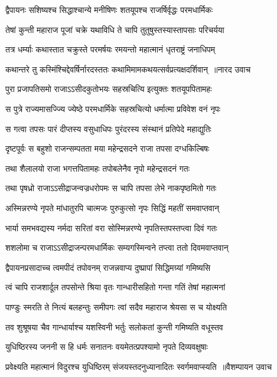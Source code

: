 \twolineshloka
{द्वैपायनः सशिष्यश्च सिद्धाश्चान्ये मनीषिणः}
{शतयूपश्च राजर्षिर्वृद्धः परमधार्मिकः}


\twolineshloka
{तेषां कुन्ती महाराज पूजां चक्रे यथाविधि}
{ते चापि तुतुषुस्तस्यास्तापसाः परिचर्यया}


\twolineshloka
{तत्र धर्म्याः कथास्तात चक्रुस्ते परमर्षयः}
{रमयन्तो महात्मानं धृतराष्ट्रं जनाधिपम्}


\threelineshloka
{कथान्तरे तु कस्मिंश्चिद्देवर्षिर्नारदस्ततः}
{कथामिमामकथयत्सर्वप्रत्यक्षदर्शिवान् ॥नारद उवाच}
{}


\twolineshloka
{पुरा प्रजापतिसमो राजाऽऽसीदकुतोभयः}
{सहस्रचित्यि इत्युक्तः शतयूपपितामहः}


\twolineshloka
{स पुत्रे राज्यमासज्ज्यि ज्येष्ठे परमधार्मिके}
{सहस्रचित्यो धर्मात्मा प्रविवेश वनं नृपः}


\twolineshloka
{स गत्वा तपसः पारं दीप्तस्य वसुधाधिपः}
{पुरंदरस्य संस्थानं प्रतिपेदे महाद्युतिः}


\twolineshloka
{दृष्टपूर्वः स बहुशो राजन्सम्पतता मया}
{महेन्द्रसदने राजा तपसा दग्धकिल्बिषः}


\twolineshloka
{तथा शैलालयो राजा भगत्तपितामहः}
{तपोबलेनैव नृपो महेन्द्रसदनं गतः}


\twolineshloka
{तथा पृषध्रो राजाऽऽसीद्राजन्वज्रधरोपमः}
{स चापि तपसा लेभे नाकपृष्ठमितो गतः}


\twolineshloka
{अस्मिन्नरण्ये नृपते मांधातुरपि चात्मजः}
{पुरुकुत्सो नृपः सिद्धिं महतीं समवाप्तवान्}


\twolineshloka
{भार्या समभवद्यस्य नर्मदा सरितां वरा}
{सोस्मिन्नरण्ये नृपतिस्तपस्तप्त्वा दिवं गतः}


\twolineshloka
{शशलोमा च राजाऽऽसीद्राजन्परमधार्मिकः}
{सम्यगस्मिन्वने तप्त्वा ततो दिवमवाप्तवान्}


\twolineshloka
{द्वैपायनप्रसादाच्च त्वमपीदं तपोवनम्}
{राजन्नवाप्य दुष्प्रापां सिद्धिमग्र्यां गमिष्यसि}


\twolineshloka
{त्वं चापि राजशार्दूल तपसोन्ते श्रिया वृतः}
{गान्धारीसहितो गन्ता गतिं तेषां महात्मनां}


\twolineshloka
{पाण्डुः स्मरति ते नित्यं बलहन्तुः समीपगः}
{त्वां सदैव महाराज श्रेयसा स च योक्ष्यति}


\twolineshloka
{तव शुश्रूषया चैव गान्धार्याश्च यशस्विनी}
{भर्तुः सलोकतां कुन्ती गमिष्यति वधूस्तव}


\twolineshloka
{युधिष्ठिरस्य जननी स हि धर्मः सनातनः}
{वयमेतत्प्रपश्यामो नृपते दिव्यवक्षुषाः}


\threelineshloka
{प्रवेक्ष्यति महात्मानं विदुरश्च युधिष्ठिरम्}
{संजयस्तदनुध्यानादितः स्वर्गमवाप्स्यति ॥वैशम्पायन उवाच}
{}


